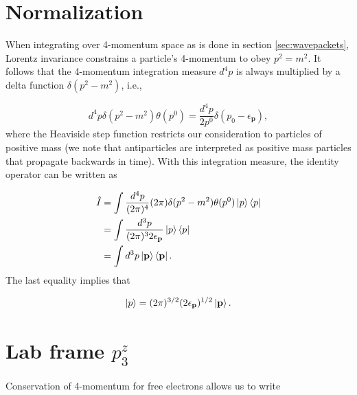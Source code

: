 \documentclass{article}
\begin{document}
\pagebreak
\section{Normalization}
\label{app:normalization}

When integrating over 4-momentum space as is done in section
\ref{sec:wavepackets}, Lorentz invariance constrains a particle's 4-momentum to
obey $p^2 = m^2$.
It follows that the 4-momentum integration measure $d^4p$ is always multiplied
by a delta function $\delta(p^2-m^2)$, i.e.,

\begin{equation}
    d^4p\delta(p^2 - m^2)\theta(p^0)
    =
    \frac{d^4p}{2p^0}\delta(p_0 - \epsilon_\mathbf{p}),
\end{equation}
%
where the Heaviside step function restricts our consideration to particles of
positive mass (we note that antiparticles are interpreted as positive mass
particles that propagate backwards in time).  With this integration measure,
the identity operator can be written as

\begin{equation}
\label{eq:identity}
\begin{aligned}
    \hat{I}
    &=
    \int \frac{d^4p}{(2\pi)^4}(2\pi)\delta(p^2 - m^2)\theta(p^0)
    \ket{p}\bra{p}
    \\&=
    \int \frac{d^3p}{(2\pi)^3 2\epsilon_\mathbf{p}}
    \ket{p}\bra{p}
    \\&=
    \int d^3p
    \ket{\mathbf{p}}\bra{\mathbf{p}}.
\end{aligned}
\end{equation}
%
The last equality implies that

\begin{equation}
\label{eq:normalization}
    \ket{p} = (2\pi)^{3/2}(2\epsilon_\mathbf{p})^{1/2}\ket{\mathbf{p}}.
\end{equation}


\pagebreak
\section{Lab frame $p^z_3$}
\label{app:p3z}

Conservation of 4-momentum for free electrons allows us to write
\end{document}

